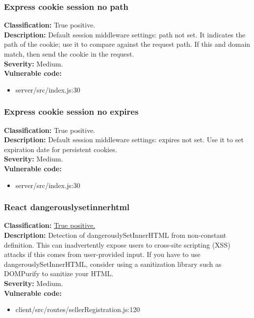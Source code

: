 \documentclass[]{article}
\begin{document}
\subsubsection{Express cookie session no path}
\textbf{Classification:} True positive. \\ 
\textbf{Description:} Default session middleware settings: path not set. It indicates the path of the cookie; 
use it to compare against the request path. If this and domain match, then send the cookie in the request. \\ 
\textbf{Severity:} Medium. \\ 
\textbf{Vulnerable code:} 
\begin{itemize}
    \item server/src/index.js:30
\end{itemize}

\subsubsection{Express cookie session no expires}
\textbf{Classification:} True positive. \\ 
\textbf{Description:}  Default session middleware settings: expires not set. Use it to set expiration date for persistent cookies. \\ 
\textbf{Severity:} Medium. \\ 
\textbf{Vulnerable code:} 
\begin{itemize}
    \item server/src/index.js:30
\end{itemize}

\subsubsection{React dangerouslysetinnerhtml}
\textbf{Classification:} \hyperref[par:stored_xss]{True positive.} \\ 
\textbf{Description:} Detection of dangerouslySetInnerHTML from non-constant definition. This can 
inadvertently expose users to cross-site scripting (XSS) attacks if this comes from user-provided
input. If you have to use dangerouslySetInnerHTML, consider using a sanitization library such as 
DOMPurify to sanitize your HTML. \\ 
\textbf{Severity:} Medium. \\ 
\textbf{Vulnerable code:} 
\begin{itemize}
    \item client/src/routes/sellerRegistration.js:120
\end{itemize}
\end{document}
